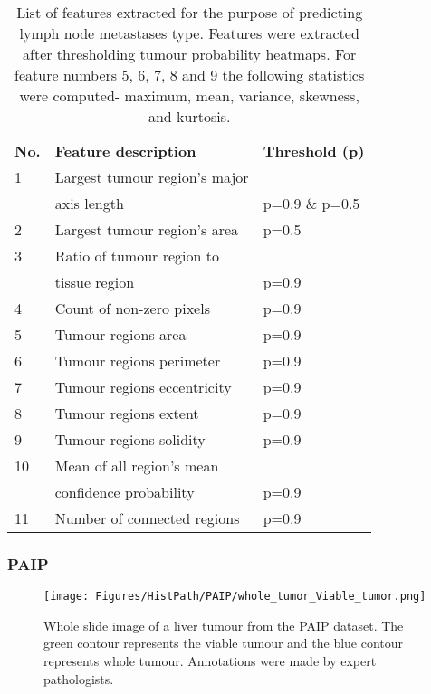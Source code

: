\documentclass[times,twocolumn,final,authoryear]{tmp}
\begin{document}
\begin{table}
\centering
\caption{List of features extracted for the purpose of predicting lymph node metastases type. Features were extracted after thresholding tumour probability heatmaps. For feature numbers 5, 6, 7, 8 and 9 the following statistics were computed- maximum, mean, variance, skewness, and kurtosis.}
\label{path_tab:metastases-features}
\setlength{\tabcolsep}{3pt}
\begin{tabular}{@{}lll@{}}
  
\textbf{No.} & \textbf{Feature description}                                        & \textbf{Threshold (p)} \\    
1            & Largest tumour region’s major & \\ 
             & axis length                            & p=0.9 \& p=0.5         \\
2            & Largest tumour region's area                                         & p=0.5                  \\
3            & Ratio of tumour region to  & \\
            & tissue region                              & p=0.9                  \\
4            & Count of non-zero pixels                                            & p=0.9                  \\
5            & Tumour regions area         & p=0.9                  \\
6            & Tumour regions perimeter    & p=0.9                  \\
7            & Tumour regions eccentricity & p=0.9                  \\
8            & Tumour regions extent       & p=0.9                  \\
9            & Tumour regions solidity     & p=0.9                  \\
10           & Mean of all region's mean & \\
             & confidence probability                 & p=0.9                  \\
11           & Number of connected regions                                         & p=0.9                  \\  
\end{tabular}\end{table}


\subsubsection{PAIP}
\begin{figure}[!t]
\centerline{\texttt{[image: Figures/HistPath/PAIP/whole\_tumor\_Viable\_tumor.png]}}
    \caption{Whole slide image of a liver tumour from the PAIP dataset. The green contour represents the viable tumour and the blue contour represents whole tumour. Annotations were made by expert pathologists.}
    \label{path_fig:viable-whole-tumour}
\end{figure}
\end{document}
